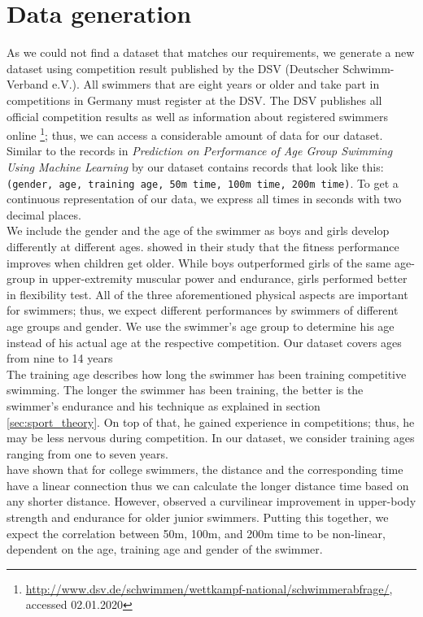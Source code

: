 \section{Data generation}\label{sec:data_gen}
As we could not find a dataset that matches our requirements, we generate a new dataset using competition result published by the DSV (Deutscher Schwimm-Verband e.V.). All swimmers that are eight years or older and take part in competitions in Germany must register at the DSV. The DSV publishes all official competition results as well as information about registered swimmers online \footnote{\url{http://www.dsv.de/schwimmen/wettkampf-national/schwimmerabfrage/}, accessed 02.01.2020}; thus, we can access a considerable amount of data for our dataset.\\
Similar to the records in \textit{Prediction on Performance of Age Group Swimming Using Machine Learning} by \citet{Xie.2015} our dataset contains records that look like this: \texttt{(gender, age, training age, 50m time, 100m time, 200m time)}. To get a continuous representation of our data, we express all times in seconds with two decimal places.\\
We include the gender and the age of the swimmer as boys and girls develop differently at different ages. \citet{Golle.2015} showed in their study that the fitness performance improves when children get older. While boys outperformed girls of the same age-group in upper-extremity muscular power and endurance, girls performed better in flexibility test. All of the three aforementioned physical aspects are important for swimmers; thus, we expect different performances by swimmers of different age groups and gender. We use the swimmer's age group to determine his age instead of his actual age at the respective competition. Our dataset covers ages from nine to 14 years\\
The training age describes how long the swimmer has been training competitive swimming. The longer the swimmer has been training, the better is the swimmer's endurance and his technique as explained in section \ref{sec:sport_theory}. On top of that, he gained experience in competitions; thus, he may be less nervous during competition. In our dataset, we consider training ages ranging from one to seven years.\\
\citet{Wakayoshi.1992} have shown that for college swimmers, the distance and the corresponding time have a linear connection thus we can calculate the longer distance time based on any shorter distance. However, \citet{Golle.2015} observed a curvilinear improvement in upper-body strength and endurance for older junior swimmers. Putting this together, we expect the correlation between 50m, 100m, and 200m time to be non-linear, dependent on the age, training age and gender of the swimmer.\\
